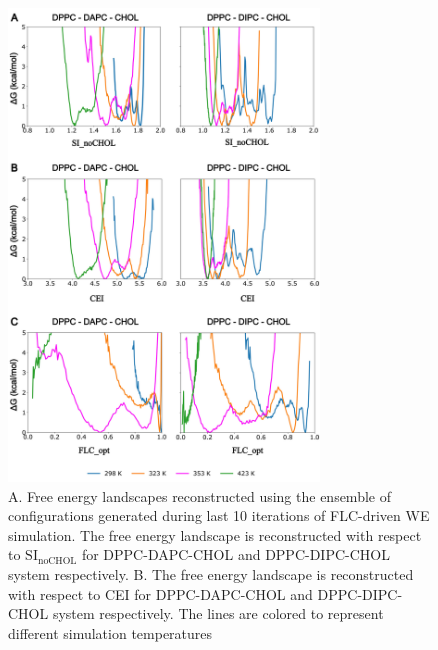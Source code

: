 \documentclass{biophys-new}
\begin{document}
\begin{figure}[hbt!]
    \centering
    \includegraphics[width=3.25in]{Figures/Main/6/placeholder_v0.jpg}
    \caption{A. Free energy landscapes reconstructed using the ensemble of configurations generated during last 10 iterations of FLC-driven WE simulation. The free energy landscape is reconstructed with respect to $\text{SI}_{\text{noCHOL}}$ for DPPC-DAPC-CHOL and DPPC-DIPC-CHOL system respectively. B. The free energy landscape is reconstructed with respect to CEI for DPPC-DAPC-CHOL and DPPC-DIPC-CHOL system respectively. The lines are colored to represent different simulation temperatures}
    \label{figs6:view}
\end{figure}
\end{document}
